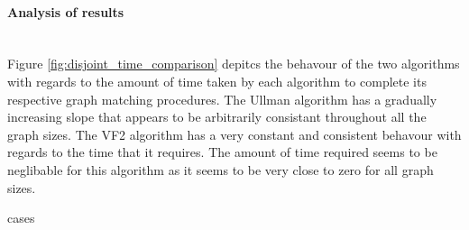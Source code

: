 \paragraph{Analysis of results}\mbox{}\\
 Figure \ref{fig:disjoint_time_comparison} depitcs the behavour of the two algorithms with regards to the amount of time taken by each algorithm to complete its 
 respective graph matching procedures.\newline\newline
 The Ullman algorithm has a gradually increasing slope that appears to be arbitrarily consistant throughout all the graph sizes. The VF2 algorithm has a 
 very constant and consistent behavour with regards to the time that it requires. The amount of time required seems to be neglibable for this algorithm as
  it seems to be very close to zero for all graph sizes.
  
 
  \newpage
{cases}
  \newpage